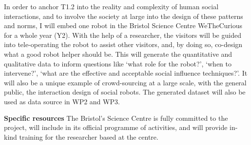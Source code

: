 In order to anchor T1.2 into the reality and complexity of human social
interactions, and to involve the society at large into the design of these
patterns and norms, I will embed one \project robot in the Bristol Science
Centre WeTheCurious for a whole year (Y2). With the help of a researcher, the
visitors will be guided into tele-operating the robot to assist other visitors,
and, by doing so, co-design what a good robot helper should be. This will
generate the quantitative and qualitative data to inform questions like `what
role for the robot?', `when to intervene?', `what are the effective and
acceptable social influence techniques?'. It will also be a unique example of
crowd-sourcing at a large scale, with the general public, the interaction design
of social robots.  The generated dataset will also be used as data source in WP2
and WP3.

\textbf{Specific resources} The Bristol's Science Centre is fully committed to the
project, will include \project in its official programme of activities, and will
provide in-kind training for the \project researcher based at the centre.

% 
% 
% 
% 
% 
% 
% 
% 
% 



